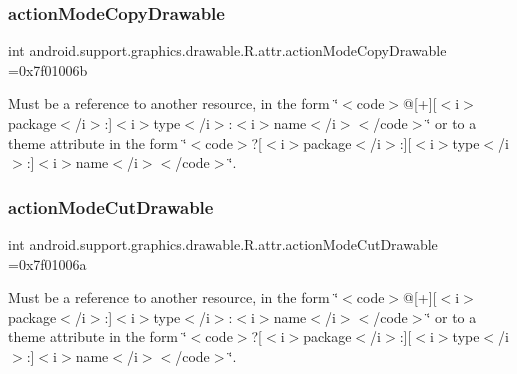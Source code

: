\subsubsection{\texorpdfstring{action\+Mode\+Copy\+Drawable}{actionModeCopyDrawable}}
{\footnotesize\ttfamily int android.\+support.\+graphics.\+drawable.\+R.\+attr.\+action\+Mode\+Copy\+Drawable =0x7f01006b\hspace{0.3cm}{\ttfamily [static]}}

Must be a reference to another resource, in the form \char`\"{}$<$code$>$@\mbox{[}+\mbox{]}\mbox{[}$<$i$>$package$<$/i$>$\+:\mbox{]}$<$i$>$type$<$/i$>$\+:$<$i$>$name$<$/i$>$$<$/code$>$\char`\"{} or to a theme attribute in the form \char`\"{}$<$code$>$?\mbox{[}$<$i$>$package$<$/i$>$\+:\mbox{]}\mbox{[}$<$i$>$type$<$/i$>$\+:\mbox{]}$<$i$>$name$<$/i$>$$<$/code$>$\char`\"{}. \mbox{\label{classandroid_1_1support_1_1graphics_1_1drawable_1_1R_1_1attr_a6ade353f42b8fa6bc808dde93e5f5ecf}} 
\subsubsection{\texorpdfstring{action\+Mode\+Cut\+Drawable}{actionModeCutDrawable}}
{\footnotesize\ttfamily int android.\+support.\+graphics.\+drawable.\+R.\+attr.\+action\+Mode\+Cut\+Drawable =0x7f01006a\hspace{0.3cm}{\ttfamily [static]}}

Must be a reference to another resource, in the form \char`\"{}$<$code$>$@\mbox{[}+\mbox{]}\mbox{[}$<$i$>$package$<$/i$>$\+:\mbox{]}$<$i$>$type$<$/i$>$\+:$<$i$>$name$<$/i$>$$<$/code$>$\char`\"{} or to a theme attribute in the form \char`\"{}$<$code$>$?\mbox{[}$<$i$>$package$<$/i$>$\+:\mbox{]}\mbox{[}$<$i$>$type$<$/i$>$\+:\mbox{]}$<$i$>$name$<$/i$>$$<$/code$>$\char`\"{}. \mbox{\label{classandroid_1_1support_1_1graphics_1_1drawable_1_1R_1_1attr_a0d6b7f01cdbf7c5e57601c72d6a5b046}} 
